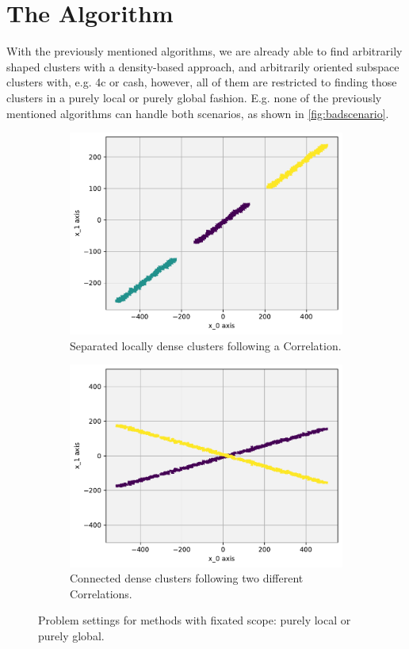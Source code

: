 \section{The Algorithm}
With the previously mentioned algorithms, we are already able to find arbitrarily shaped clusters with a density-based approach, and arbitrarily oriented subspace clusters with, e.g. \gls{4c} or \gls{cash}, however, all of them are restricted to finding those clusters in a purely local or purely global fashion. E.g. none of the previously mentioned algorithms can handle both scenarios, as shown in \autoref{fig:badscenario}.

\begin{figure}
    \centering
    \begin{subfigure}[t]{0.47\textwidth}
      \centering
      \includegraphics[width=.8\textwidth]{figures_method/piecewisecorrs.pdf}
      \captionsetup{width=0.8\linewidth}
      \caption{Separated locally dense clusters following a Correlation.}
      \label{fig:scenario1}
    \end{subfigure}%
    \begin{subfigure}[t]{0.47\textwidth}
      \centering
      \includegraphics[width=.8\textwidth]{figures_method/xcorrs.pdf}
      \captionsetup{width=0.8\linewidth}
      \caption{Connected dense clusters following two different Correlations.}
      \label{fig:scenario2}
    \end{subfigure}
    \caption{Problem settings for methods with fixated scope: purely local or purely global.}
    \label{fig:badscenario}
\end{figure}

